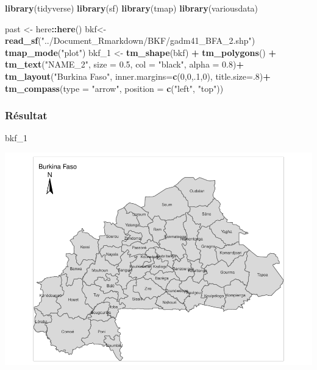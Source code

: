 \documentclass[
  12pt,
]{article}
\newenvironment{Shaded}{\begin{snugshade}}{\end{snugshade}}
\newcommand{\AttributeTok}[1]{\textcolor[rgb]{0.13,0.29,0.53}{#1}}
\newcommand{\DecValTok}[1]{\textcolor[rgb]{0.00,0.00,0.81}{#1}}
\newcommand{\FloatTok}[1]{\textcolor[rgb]{0.00,0.00,0.81}{#1}}
\newcommand{\FunctionTok}[1]{\textcolor[rgb]{0.13,0.29,0.53}{\textbf{#1}}}
\newcommand{\NormalTok}[1]{#1}
\newcommand{\OtherTok}[1]{\textcolor[rgb]{0.56,0.35,0.01}{#1}}
\newcommand{\SpecialCharTok}[1]{\textcolor[rgb]{0.81,0.36,0.00}{\textbf{#1}}}
\newcommand{\StringTok}[1]{\textcolor[rgb]{0.31,0.60,0.02}{#1}}
\begin{document}
\begin{Shaded}
\begin{Highlighting}[]
\FunctionTok{library}\NormalTok{(tidyverse)}
\FunctionTok{library}\NormalTok{(sf)}
\FunctionTok{library}\NormalTok{(tmap)}
\FunctionTok{library}\NormalTok{(variousdata)}

\NormalTok{past }\OtherTok{\textless{}{-}}\NormalTok{ here}\SpecialCharTok{::}\FunctionTok{here}\NormalTok{()}
\NormalTok{bkf}\OtherTok{\textless{}{-}} \FunctionTok{read\_sf}\NormalTok{(}\StringTok{"../Document\_Rmarkdown/BKF/gadm41\_BFA\_2.shp"}\NormalTok{)}
\FunctionTok{tmap\_mode}\NormalTok{(}\StringTok{"plot"}\NormalTok{)}
\NormalTok{bkf\_1 }\OtherTok{\textless{}{-}} \FunctionTok{tm\_shape}\NormalTok{(bkf) }\SpecialCharTok{+} 
    \FunctionTok{tm\_polygons}\NormalTok{() }\SpecialCharTok{+} 
   \FunctionTok{tm\_text}\NormalTok{(}\StringTok{"NAME\_2"}\NormalTok{, }\AttributeTok{size =} \FloatTok{0.5}\NormalTok{, }\AttributeTok{col =} \StringTok{"black"}\NormalTok{, }\AttributeTok{alpha =} \FloatTok{0.8}\NormalTok{)}\SpecialCharTok{+}
  \FunctionTok{tm\_layout}\NormalTok{(}\StringTok{"Burkina Faso"}\NormalTok{, }\AttributeTok{inner.margins=}\FunctionTok{c}\NormalTok{(}\DecValTok{0}\NormalTok{,}\DecValTok{0}\NormalTok{,.}\DecValTok{1}\NormalTok{,}\DecValTok{0}\NormalTok{), }\AttributeTok{title.size=}\NormalTok{.}\DecValTok{8}\NormalTok{)}\SpecialCharTok{+}
  \FunctionTok{tm\_compass}\NormalTok{(}\AttributeTok{type =} \StringTok{"arrow"}\NormalTok{, }\AttributeTok{position =} \FunctionTok{c}\NormalTok{(}\StringTok{"left"}\NormalTok{, }\StringTok{"top"}\NormalTok{)) }
\end{Highlighting}
\end{Shaded}

\subsubsection{Résultat}\label{ruxe9sultat-2}

\begin{Shaded}
\begin{Highlighting}[]
\NormalTok{bkf\_1}
\end{Highlighting}
\end{Shaded}

\includegraphics{Document_RMD_GRP_files/figure-latex/spatial-1.pdf}
\end{document}
